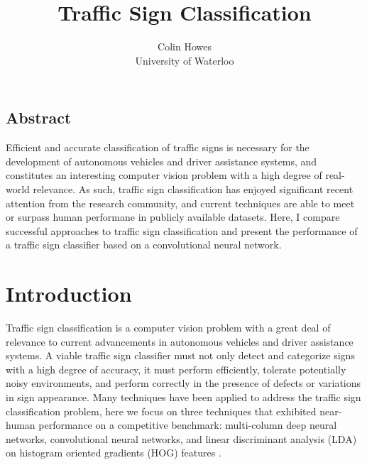 \documentclass[letterpaper,twocolumn,10pt]{article}
\begin{document}
\date{}

\title{\Large \bf Traffic Sign Classification}

\author{
	{\rm Colin Howes}\\
	University of Waterloo
} %

\maketitle

\thispagestyle{empty}


\subsection*{Abstract}

Efficient and accurate classification of traffic signs is necessary for the development of autonomous vehicles and driver assistance systems, and constitutes an interesting computer vision problem with a high degree of real-world relevance. As such, traffic sign classification has enjoyed significant recent attention from the research community, and current techniques are able to meet or surpass human performane in publicly available datasets. Here, I compare successful approaches to traffic sign classification and present the performance of a traffic sign classifier based on a convolutional neural network.


\section{Introduction}

Traffic sign classification is a computer vision problem with a great deal of relevance to current advancements in autonomous vehicles and driver assistance systems. A viable traffic sign classifier must not only detect and categorize signs with a high degree of accuracy, it must perform efficiently, tolerate potentially noisy environments, and perform correctly in the presence of defects or variations in sign appearance. Many techniques have been applied to address the traffic sign classification problem, here we focus on three techniques that exhibited near-human performance on a competitive benchmark: multi-column deep neural networks, convolutional neural networks, and linear discriminant analysis (LDA) on histogram oriented gradients (HOG) features \cite{stallkamp_german_2011, stallkamp_man_2012, ciresan_committee_2011, sermanet_traffic_2011, ciresan_multi-column_2012}.
\end{document}
